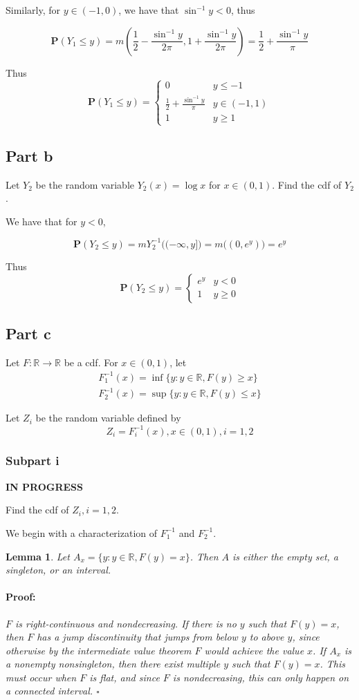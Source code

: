 \documentclass{article}
\newenvironment{proof}{\paragraph{Proof:}}{\hfill$\square$}
\newtheorem{lemma}[theorem]{Lemma}
\newcommand{\R}{\mathbb{R}}
\newcommand{\prob}{\boldsymbol{P}}
\begin{document}
Similarly, for $y \in (-1, 0)$, we have that $\sin^{-1} y < 0$, thus

\[
\prob(Y_1 \leq y) = m\left( \frac{1}{2} - \frac{\sin^{-1}y}{2\pi}, 1 + \frac{\sin^{-1}y}{2\pi} \right) = \frac{1}{2} + \frac{\sin^{-1}y}{\pi}
\]

Thus
\[
\prob(Y_1 \leq y) =
\begin{cases}
0 & y \leq -1 \\
\frac{1}{2} + \frac{\sin^{-1}y}{\pi} & y \in (-1, 1) \\
1 & y \geq 1
\end{cases}
\]

\subsection*{Part b}

Let $Y_2$ be the random variable $Y_2(x) = \log x$ for $x \in (0, 1)$. Find the cdf of $Y_2$.

We have that for $y < 0$,

\[
\prob(Y_2 \leq y) = mY_2^{-1}\bigl( (-\infty, y] \bigl) = m\bigl( (0, e^y) \bigl) = e^y
\]

Thus
\[
\prob(Y_2 \leq y) =
\begin{cases}
e^y & y < 0 \\
1 & y \geq 0
\end{cases}
\]

\subsection*{Part c}

Let $F: \R \rightarrow \R$ be a cdf. For $x \in (0, 1)$, let
\begin{gather*}
F_1^{-1}(x) = \inf\{ y: y \in \R, F(y) \geq x\} \\
F_2^{-1}(x) = \sup\{ y: y \in \R, F(y) \leq x\}
\end{gather*}

Let $Z_i$ be the random variable defined by
\[
Z_i = F_i^{-1}(x), x \in (0, 1), i = 1, 2
\]
\subsubsection*{Subpart i}

\textbf{IN PROGRESS}

Find the cdf of $Z_i, i = 1, 2$.

We begin with a characterization of $F_1^{-1}$ and $F_2^{-1}$.

\begin{lemma}
Let $A_x = \{ y: y \in \R, F(y) = x \}$. Then $A$ is either the empty set, a singleton, or an interval.
\begin{proof}
$F$ is right-continuous and nondecreasing. If there is no $y$ such that $F(y) = x$, then $F$ has a jump discontinuity that jumps from below $y$ to above $y$, since otherwise by the intermediate value theorem $F$ would achieve the value $x$. If $A_x$ is a nonempty nonsingleton, then there exist multiple $y$ such that $F(y) = x$. This must occur when $F$ is flat, and since $F$ is nondecreasing, this can only happen on a connected interval.
\end{proof}
\end{lemma}
\end{document}
